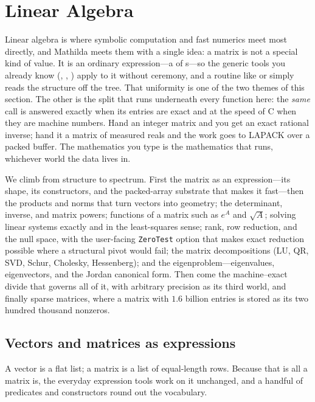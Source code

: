 \section{Linear Algebra}
\label{sec:linalg}

Linear algebra is where symbolic computation and fast numerics meet most
directly, and Mathilda meets them with a single idea: a matrix is not a special
kind of value. It is an ordinary expression---a  of s---so the
generic tools you already know (, , ) apply to it
without ceremony, and a routine like  or  simply reads the
structure off the tree. That uniformity is one of
the two themes of this section. The other is the split that runs underneath every
function here: the \emph{same} call is answered exactly when its entries are exact
and at the speed of C when they are machine numbers. Hand  an integer
matrix and you get an exact rational inverse; hand it a matrix of measured reals
and the work goes to LAPACK over a packed buffer. The mathematics you type is the
mathematics that runs, whichever world the data lives in.

We climb from structure to spectrum. First the matrix as an expression---its
shape, its constructors, and the packed-array substrate that makes it
fast---then the products and norms that turn vectors into geometry; the
determinant, inverse, and matrix powers; functions of a matrix such as
\(e^{A}\) and \(\sqrt{A}\); solving linear systems exactly and in
the least-squares sense; rank, row reduction, and the null space, with the
user-facing \texttt{ZeroTest} option that makes exact reduction possible where a
structural pivot would fail; the matrix decompositions (LU, QR, SVD,
Schur, Cholesky, Hessenberg); and the eigenproblem---eigenvalues, eigenvectors,
and the Jordan canonical form. Then come the machine--exact divide that governs
all of it, with arbitrary precision as its third world, and finally sparse
matrices, where a matrix with \(1.6\) billion entries is stored as its two hundred
thousand nonzeros.

\subsection{Vectors and matrices as expressions}
\label{ssec:la-matrices}

A vector is a flat list; a matrix is a list of equal-length rows. Because that is
all a matrix is, the everyday expression tools work on it unchanged, and a
handful of predicates and constructors round out the vocabulary.

